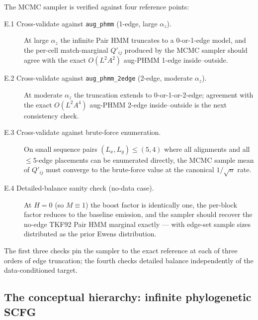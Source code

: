 The MCMC sampler is verified against four reference points:

\begin{description}
\item[E.1 Cross-validate against \texttt{aug\_phmm} (1-edge, large
  $\alpha_z$).] At large $\alpha_z$ the infinite Pair HMM truncates
  to a 0-or-1-edge model, and the per-cell match-marginal
  $Q'_{ij}$ produced by the MCMC sampler should agree with the
  exact $O(L^2 A^2)$ aug-PHMM 1-edge inside--outside.
\item[E.2 Cross-validate against \texttt{aug\_phmm\_2edge} (2-edge,
  moderate $\alpha_z$).] At moderate $\alpha_z$ the truncation
  extends to 0-or-1-or-2-edge; agreement with the exact
  $O(L^2 A^4)$ aug-PHMM 2-edge inside--outside is the next
  consistency check.
\item[E.3 Cross-validate against brute-force enumeration.] On
  small sequence pairs $(L_x, L_y) \leq (5, 4)$ where all
  alignments and all $\leq 5$-edge placements can be enumerated
  directly, the MCMC sample mean of $Q'_{ij}$ must converge to the
  brute-force value at the canonical $1/\sqrt{n}$ rate.
\item[E.4 Detailed-balance sanity check (no-data case).] At
  $H = 0$ (so $M \equiv 1$) the boost factor is identically one,
  the per-block factor reduces to the baseline emission, and the
  sampler should recover the no-edge TKF92 Pair HMM marginal
  exactly --- with edge-set sample sizes distributed as the
  prior Ewens distribution.
\end{description}

The first three checks pin the sampler to the exact reference at
each of three orders of edge truncation; the fourth checks
detailed balance independently of the data-conditioned target.

\subsection{The conceptual hierarchy: infinite phylogenetic SCFG}
\label{sec:phylo-scfg}

